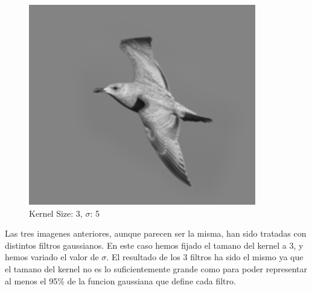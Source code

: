 \documentclass{article}
\begin{document}
\begin{minipage}{\linewidth}
    \begin{minipage}{0.45\linewidth}
        \begin{figure}[H]
            \includegraphics[width=\linewidth]{Ejercicio1a/gaussiana(3,3)5.png}
            \caption{Kernel Size: 3, $\sigma$: 5}
        \end{figure}
    \end{minipage}    
\end{minipage}
\linebreak
Las tres imagenes anteriores, aunque parecen ser la misma, han sido tratadas con distintos filtros gaussianos. En este caso hemos fijado el tamano del kernel a 3, y hemos variado el valor de $\sigma$. El resultado de los 3 filtros ha sido el mismo ya que el tamano del kernel no es lo suficientemente grande como para poder representar al menos el 95\% de la funcion gaussiana que define cada filtro.
\end{document}
